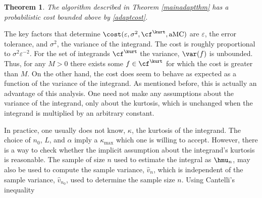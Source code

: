 \documentclass[12pt]{amsart}
\newcommand{\hv}{\hat{v}}
\newtheorem{theorem}{Theorem}
\DeclareMathOperator{\aMC}{aMC}
\begin{document}
\begin{theorem} \label{costtheorem} The algorithm described in Theorem \ref{mainadaptthm} has a probabilistic cost bounded above by \eqref{adaptcost}.
\end{theorem}

The key factors that determine $\cost(\varepsilon,\sigma^2,\cf^{\kurt},\aMC)$ are $\varepsilon$, the error tolerance, and $\sigma^2$, the variance of the integrand.  The cost is roughly proportional to $\sigma^2\varepsilon^{-2}$.  For the set of integrands $\cf^{\kurt}$ the variance, $\var(f)$ is unbounded.  Thus, for any $M>0$ there exists some $f \in \cf^{\kurt}$ for which the cost is greater than $M$.  On the other hand, the cost does seem to behave as expected as a function of the variance of the integrand.  As mentioned before, this is actually an advantage of this analysis.  One need not make any assumptions about the variance of the integrand, only about the kurtosis, which is unchanged when the integrand is multiplied by an arbitrary constant.

In practice, one usually does not know, $\kappa$, the kurtosis of the integrand. The choice of $n_0$, $L$, and $\alpha$ imply a $\kappa_{\max}$ which one is willing to accept.  However, there is a way to check whether the implicit assumption about the integrand's kurtosis is reasonable.  The sample of size $n$ used to estimate the integral as $\hmu_n$, may also be used to compute the sample variance, $\hv_n$, which is independent of the sample variance, $\hv_{n_0}$, used to determine the sample size $n$. Using Cantelli's inequality
\end{document}
